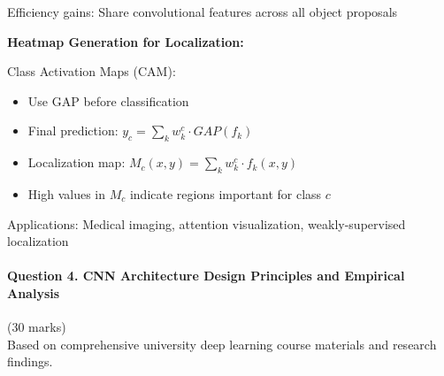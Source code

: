 \documentclass[12pt]{article}
\begin{document}
\begin{enumerate}[(a)]
{    Efficiency gains: Share convolutional features across all object proposals
    
    \textbf{Heatmap Generation for Localization:}
    
    Class Activation Maps (CAM):
    \begin{itemize}
        \item Use GAP before classification
        \item Final prediction: $y_c = \sum_k w_k^c \cdot GAP(f_k)$
        \item Localization map: $M_c(x,y) = \sum_k w_k^c \cdot f_k(x,y)$
        \item High values in $M_c$ indicate regions important for class $c$
    \end{itemize}
    
    Applications: Medical imaging, attention visualization, weakly-supervised localization
    }
\end{enumerate}

\newpage
\paragraph{Question 4. CNN Architecture Design Principles and Empirical Analysis}{{\hfill (30 marks)}}\\
Based on comprehensive university deep learning course materials and research findings.
\end{document}

